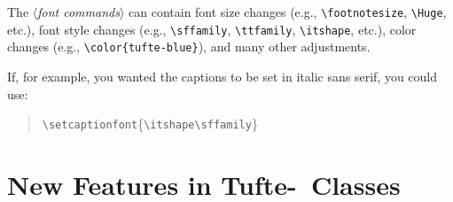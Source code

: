 \documentclass[a4paper]{tufte-handout}
\newcommand{\TL}{Tufte-\hologo{LaTeX}\xspace}
\newcommand{\hlorange}[1]{\textcolor{tufte-orange}{#1}}
\newcommand{\doccmd}[1]{\hlorange{\texttt{\textbackslash#1}}}
\newcommand{\docopt}[1]{\( \langle \)\textrm{\textit{#1}}\( \rangle \)}
\newenvironment{docspec}
  {\begin{quotation}\ttfamily\parskip0pt\parindent0pt\ignorespaces}
  {\end{quotation}}
\begin{document}
The \docopt{font commands} can contain font size changes (e.g., \doccmd{footnotesize}, \doccmd{Huge}, etc.), font style changes (e.g., \doccmd{sffamily}, \doccmd{ttfamily}, \doccmd{itshape}, etc.), color changes (e.g., \doccmd{color}\texttt{\{tufte-blue\}}), and many other adjustments.

If, for example, you wanted the captions to be set in italic sans serif, you could use:
\begin{docspec}
  \doccmd{setcaptionfont}\{\doccmd{itshape}\doccmd{sffamily}\}
\end{docspec}


\pagebreak
\section[New Features in Tufte-LaTeX Classes]{New Features in \TL\ Classes}\label{sec:new-features-tufte-latex-classes}
\end{document}
